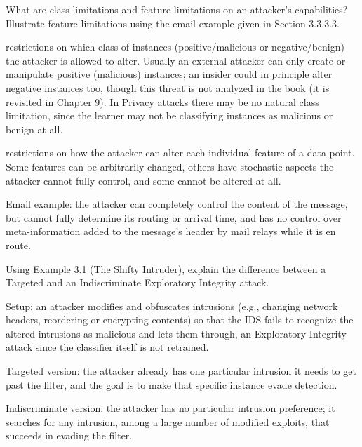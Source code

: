 \documentclass[10pt]{extarticle}
\newcommand{\resposta}[1]{\par\smallskip\noindent #1}
\begin{document}
\begin{questoes}
\item What are class limitations and feature limitations on an attacker's capabilities? Illustrate feature limitations using the email example given in Section 3.3.3.3.

\resposta{
\begin{topicos}
\item[Class limitations:] restrictions on which class of instances (positive/malicious or negative/benign) the attacker is allowed to alter. Usually an external attacker can only create or manipulate positive (malicious) instances; an insider could in principle alter negative instances too, though this threat is not analyzed in the book (it is revisited in Chapter 9). In Privacy attacks there may be no natural class limitation, since the learner may not be classifying instances as malicious or benign at all.
\item[Feature limitations:] restrictions on how the attacker can alter each individual feature of a data point. Some features can be arbitrarily changed, others have stochastic aspects the attacker cannot fully control, and some cannot be altered at all.
\item Email example: the attacker can completely control the content of the message, but cannot fully determine its routing or arrival time, and has no control over meta-information added to the message's header by mail relays while it is en route.
\end{topicos}
}

\item Using Example 3.1 (The Shifty Intruder), explain the difference between a Targeted and an Indiscriminate Exploratory Integrity attack.

\resposta{
\begin{topicos}
\item Setup: an attacker modifies and obfuscates intrusions (e.g., changing network headers, reordering or encrypting contents) so that the IDS fails to recognize the altered intrusions as malicious and lets them through, an Exploratory Integrity attack since the classifier itself is not retrained.
\item Targeted version: the attacker already has one particular intrusion it needs to get past the filter, and the goal is to make that specific instance evade detection.
\item Indiscriminate version: the attacker has no particular intrusion preference; it searches for any intrusion, among a large number of modified exploits, that succeeds in evading the filter.
\end{topicos}
}


\end{questoes}
\end{document}

